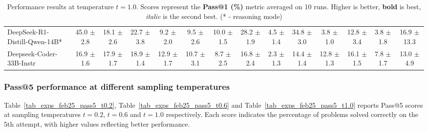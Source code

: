 \documentclass{llmxive}
\begin{document}
\begin{table}[hbt]
{\begin{tabular}{l *{13}{c}}
\rowcolor{gray!10}
 DeepSeek-R1-Distill-Qwen-14B* &
45.0 {\tiny$\pm$ 2.8} &
18.1 {\tiny$\pm$ 2.6} &
22.7 {\tiny$\pm$ 3.8} &
9.2 {\tiny$\pm$ 2.0} &
9.5 {\tiny$\pm$ 2.6} &
10.0 {\tiny$\pm$ 1.5} &
28.2 {\tiny$\pm$ 1.9} &
4.5 {\tiny$\pm$ 1.4} &
34.8 {\tiny$\pm$ 3.0} &
3.8 {\tiny$\pm$ 1.0} &
12.8 {\tiny$\pm$ 3.4} &
3.8 {\tiny$\pm$ 1.8} &
16.9 {\tiny$\pm$ 13.3} \\


Deepseek-Coder-33B-Instr &
16.9 {\tiny$\pm$ 1.6} &
17.9 {\tiny$\pm$ 1.7} &
18.9 {\tiny$\pm$ 1.4} &
12.9 {\tiny$\pm$ 1.7} &
10.7 {\tiny$\pm$ 3.1} &
8.7 {\tiny$\pm$ 2.5} &
16.8 {\tiny$\pm$ 2.4} &
2.3 {\tiny$\pm$ 1.3} &
14.4 {\tiny$\pm$ 1.4} &
12.8 {\tiny$\pm$ 1.3} &
16.1 {\tiny$\pm$ 1.5} &
7.8 {\tiny$\pm$ 1.7} &
13.0 {\tiny$\pm$ 4.9} \\

\bottomrule
\end{tabular}%
}
\caption{Performance results at temperature $t=1.0$. Scores represent the \textbf{Pass@1 (\%)} metric averaged on 10 runs. Higher is better, \textbf{bold} is best, \textit{italic} is the second best. (* - reasoning mode)}
\label{tab_exps_feb25_pass1_avg10_t1.0}
\end{table}




\subsubsection{Pass@5 performance at different sampling temperatures}

Table~\ref{tab_exps_feb25_pass5_t0.2}, Table~\ref{tab_exps_feb25_pass5_t0.6} and Table~\ref{tab_exps_feb25_pass5_t1.0} reports Pass@5 scores at sampling temperatures $t=0.2$, $t=0.6$ and $t=1.0$ respectively. Each score indicates the percentage of problems solved correctly on the 5th attempt, with higher values reflecting better performance. 
\end{document}
